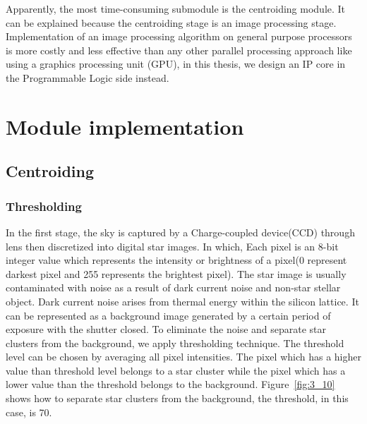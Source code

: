 \noindent Apparently, the most time-consuming submodule is the centroiding module. It can be explained because the centroiding stage is an image processing stage. Implementation of an image processing algorithm on general purpose processors is more costly and less effective than any other parallel processing approach like using a graphics processing unit (GPU), in this thesis, we design an IP core in the Programmable Logic side instead.

\section{Module implementation}

\subsection{Centroiding}

\subsubsection{Thresholding}

In the first stage, the sky is captured by a Charge-coupled device(CCD) through lens then discretized into digital star images. In which, Each pixel is an 8-bit integer value which represents the intensity or brightness of a pixel(0 represent darkest pixel and 255 represents the brightest pixel). The star image is usually contaminated with noise as a result of dark current noise and non-star stellar object. Dark current noise arises from thermal energy within the silicon lattice. It can be represented as a background image generated by a certain period of exposure with the shutter closed\cite{MDP}. To eliminate the noise and separate star clusters from the background, we apply thresholding technique. The threshold level can be chosen by averaging all pixel intensities. The pixel which has a higher value than threshold level belongs to a star cluster while the pixel which has a lower value than the threshold belongs to the background. Figure~\ref{fig:3_10} shows how to separate star clusters from the background, the threshold, in this case, is 70.



